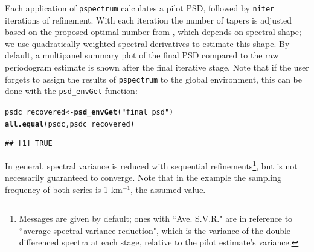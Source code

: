 \documentclass{article}\usepackage{graphicx, color}
\makeatletter
\newcommand{\hlfunctioncall}[1]{\textcolor[rgb]{0.501960784313725,0,0.329411764705882}{\textbf{#1}}}%
\newcommand{\hlstring}[1]{\textcolor[rgb]{0.6,0.6,1}{#1}}%
\newenvironment{kframe}{%
 \def\at@end@of@kframe{}%
 \ifinner\ifhmode%
  \def\at@end@of@kframe{\end{minipage}}%
  \begin{minipage}{\columnwidth}%
 \fi\fi%
 \def\FrameCommand##1{\hskip\@totalleftmargin \hskip-\fboxsep
 \colorbox{shadecolor}{##1}\hskip-\fboxsep
     \hskip-\linewidth \hskip-\@totalleftmargin \hskip\columnwidth}%
 \MakeFramed {\advance\hsize-\width
   \@totalleftmargin\z@ \linewidth\hsize
   \@setminipage}}%
 {\par\unskip\endMakeFramed%
 \at@end@of@kframe}
\newenvironment{knitrout}{}{} %
\newcommand{\Rcmd}[1]{\texttt{#1}}
\makeatother
\begin{document}
\begin{knitrout}
\begin{kframe}
{\ttfamily\noindent\itshape\color{messagecolor}{\#\# Stage\ \ 3 est. (Ave. S.V.R. -22.0 dB)}}

{\ttfamily\noindent\itshape\color{messagecolor}{\#\# Stage\ \ 4 est. (Ave. S.V.R. -28.5 dB)}}

{\ttfamily\noindent\itshape\color{messagecolor}{\#\# Stage\ \ 5 est. (Ave. S.V.R. -34.4 dB)}}

{\ttfamily\noindent\itshape\color{messagecolor}{\#\# Normalized\ \ single-sided PSD\ \ (PSD)\ \ to single-sided PSD for sampling-freq.\ \ 1}}\end{kframe}
\end{knitrout}

Each application of \Rcmd{pspectrum} calculates a pilot PSD, followed by 
\Rcmd{niter}
iterations of refinement.
With each iteration
the number of tapers is adjusted 
based on the proposed optimal number from \citet{rs1995}, which
depends on spectral shape; we use 
quadratically weighted spectral derivatives \citep{prieto2007}
to estimate this shape.
By default, a multipanel summary plot of the final PSD compared
to the raw periodogram estimate is shown after the final iterative stage.
Note that if the user forgets to assign the results of
\Rcmd{pspectrum} to the global environment, this can be
done with the \Rcmd{psd\_envGet} function:
\begin{knitrout}
\color{fgcolor}\begin{kframe}
\begin{alltt}
psdc_recovered <- \hlfunctioncall{psd_envGet}(\hlstring{"final_psd"})
\hlfunctioncall{all.equal}(psdc, psdc_recovered)
\end{alltt}
\begin{verbatim}
## [1] TRUE
\end{verbatim}
\end{kframe}
\end{knitrout}


In general, spectral variance is reduced
with sequential refinements\footnote{
Messages are given by default; ones with
``Ave. S.V.R."
are in reference to 
 ``average spectral-variance reduction", which
 is the variance of the
 double-differenced spectra at each stage, relative
 to the pilot estimate's variance.
}, but is not necessarily guaranteed to converge.
Note that in the example
the sampling frequency of both series
is 1 km$^{-1}$, the assumed value.
\end{document}
